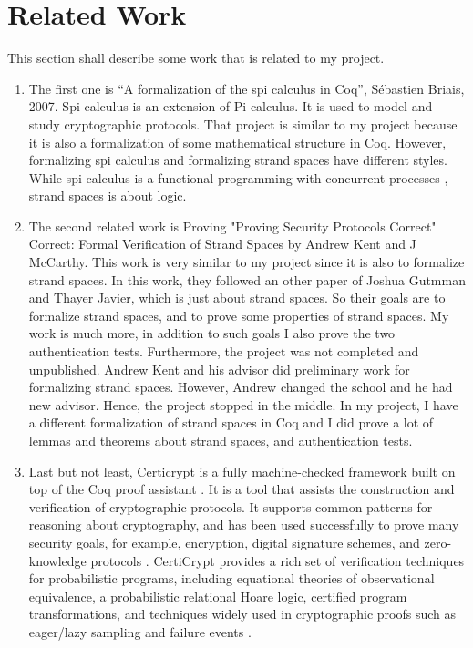 \section{Related Work}
This section shall describe some work that is related to my project.
\begin{enumerate}
\item The first one is “A formalization of the spi calculus in Coq”, Sébastien Briais,  2007. Spi calculus is an extension of Pi calculus. It is used to model and study cryptographic protocols. That project is similar to my project because it is also a formalization of some mathematical structure in Coq. However, formalizing spi calculus and formalizing strand spaces have different styles. While spi calculus is a functional programming with concurrent processes \cite{SpiCalculus}, strand spaces is about logic. 
\item The second related work is Proving "Proving Security Protocols Correct" Correct: Formal Verification of Strand Spaces by Andrew Kent and J McCarthy. 
This work is very similar to my project since it is also to formalize strand spaces. In this work, they followed an other paper of Joshua Gutmman and Thayer Javier, which is just about strand spaces. So their goals are to formalize strand spaces, and to prove some properties of strand spaces. My work is much more, in addition to such goals I also prove the two authentication tests. Furthermore, the project was not completed and unpublished. Andrew Kent and his advisor did preliminary work for formalizing strand spaces. However, Andrew changed the school and he had new advisor. Hence, the project stopped in the middle. In my project, I
have a different formalization of strand spaces in Coq and I did prove a lot of lemmas and theorems about strand spaces, and authentication tests.
\item Last but not least, Certicrypt is a fully machine-checked framework built on top of the Coq proof assistant \cite{certiCrypt}. It is a tool that assists the construction and verification of cryptographic protocols. It supports common patterns for reasoning about cryptography, and has been used successfully to prove many security goals, for example, encryption, digital signature schemes, and zero-knowledge protocols \cite{certiCrypt2}. CertiCrypt provides a rich set of verification techniques for probabilistic programs, including equational theories of observational equivalence, a probabilistic relational Hoare logic, certified program transformations, and techniques widely used in cryptographic proofs such as eager/lazy sampling and failure events \cite{certiCrypt}.   
\end{enumerate}

